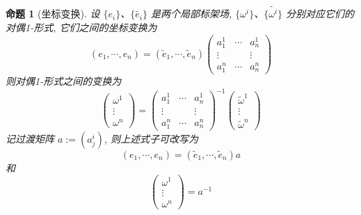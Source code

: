 \documentclass{book}
\newtheorem{proposition}[theorem]{\indent 命题}
\begin{document}
            \begin{proposition}[坐标变换]
                设 $\{e_i\}$、$\{\tilde{e_i}\}$ 是两个局部标架场, $\{\omega^i\}$、$\{\tilde{\omega^i}\}$ 分别对应它们的对偶1-形式, 它们之间的坐标变换为
                \begin{equation*}
                    (e_1,\cdots,e_n) = (\tilde{e}_1,\cdots,\tilde{e}_n)
                    \begin{pmatrix}
                        a^1_1 & \cdots & a^1_n \\
                        \vdots & & \vdots \\
                        a^n_1 & \cdots & a^n_n
                    \end{pmatrix}
                \end{equation*}
                则对偶1-形式之间的变换为
                \begin{equation*}
                    \begin{pmatrix}
                        \omega^1 \\ \vdots \\ \omega^n
                    \end{pmatrix} = 
                    \begin{pmatrix}
                        a^1_1 & \cdots & a^1_n \\
                        \vdots & & \vdots \\
                        a^n_1 & \cdots & a^n_n
                    \end{pmatrix}^{-1}
                    \begin{pmatrix}
                        \tilde{\omega}^1 \\ \vdots \\ \tilde{\omega}^n
                    \end{pmatrix}
                \end{equation*}
                记过渡矩阵 $a := (a^i_j)$, 则上述式子可改写为
                \begin{equation}
                    (e_1,\cdots,e_n) = (\tilde{e}_1,\cdots,\tilde{e}_n)a
                \end{equation}
                和
                \begin{equation}
                    \begin{pmatrix}
                        \omega^1 \\ \vdots \\ \omega^n
                    \end{pmatrix} = a^{-1}

\end{equation}
\end{proposition}
\end{document}
